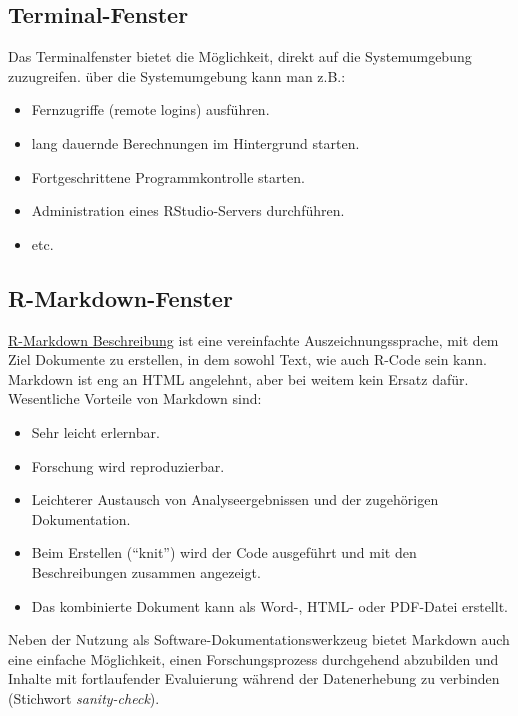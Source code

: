 \documentclass[]{article}
\providecommand{\tightlist}{%
  \setlength{\itemsep}{0pt}\setlength{\parskip}{0pt}}
\begin{document}
\subsection*{Terminal-Fenster}\label{terminal-fenster}

Das Terminalfenster bietet die Möglichkeit, direkt auf die
Systemumgebung zuzugreifen. über die Systemumgebung kann man z.B.:

\begin{itemize}
\tightlist
\item
  Fernzugriffe (remote logins) ausführen.
\item
  lang dauernde Berechnungen im Hintergrund starten.
\item
  Fortgeschrittene Programmkontrolle starten.
\item
  Administration eines RStudio-Servers durchführen.
\item
  etc.
\end{itemize}

\subsection*{R-Markdown-Fenster}\label{r-markdown-fenster}

\href{https://de.wikipedia.org/wiki/Markdown}{R-Markdown Beschreibung}
ist eine vereinfachte Auszeichnungssprache, mit dem Ziel Dokumente zu
erstellen, in dem sowohl Text, wie auch R-Code sein kann. Markdown ist
eng an HTML angelehnt, aber bei weitem kein Ersatz dafür. Wesentliche
Vorteile von Markdown sind:

\begin{itemize}
\tightlist
\item
  Sehr leicht erlernbar.
\item
  Forschung wird reproduzierbar.
\item
  Leichterer Austausch von Analyseergebnissen und der zugehörigen
  Dokumentation.
\item
  Beim Erstellen (``knit'') wird der Code ausgeführt und mit den
  Beschreibungen zusammen angezeigt.
\item
  Das kombinierte Dokument kann als Word-, HTML- oder PDF-Datei
  erstellt.
\end{itemize}

Neben der Nutzung als Software-Dokumentationswerkzeug bietet Markdown
auch eine einfache Möglichkeit, einen Forschungsprozess durchgehend
abzubilden und Inhalte mit fortlaufender Evaluierung während der
Datenerhebung zu verbinden (Stichwort \emph{sanity-check}).
\end{document}
